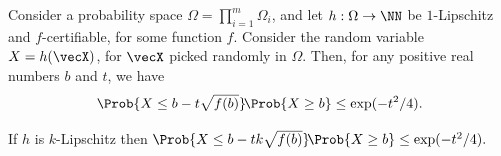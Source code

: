 \begin{theorem}
    Consider a probability space $\Omega =\prod_{i=1}^m \Omega_i$, and
    let $h:\Omega \rightarrow \NN$ be $1$-Lipschitz and
    $f$-certifiable, for some function $f$. Consider the random
    variable $X= h(\vecX)$, for $\vecX$ picked randomly in
    $\Omega$. Then, for any positive real numbers $b$ and $t$, we have
    \begin{equation*}
        \Prob{ X \leq b- t\sqrt{f(b)}}%
        \!\Prob{X \geq b} \leq \exp(-t^2/4).
    \end{equation*}

    If $h$ is $k$-Lipschitz then 
    \begin{math}
        \Prob{ X \leq b- tk\sqrt{f(b)}}%
        \!\Prob{X \geq b} \leq \exp(-t^2/4).
    \end{math}
\end{theorem}
